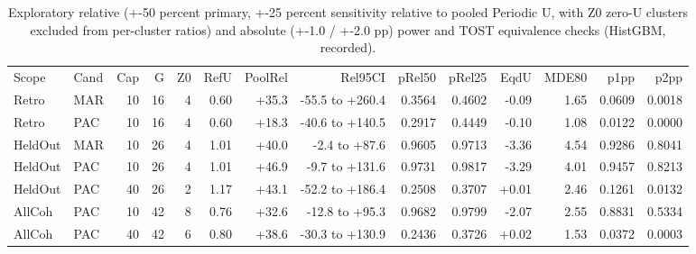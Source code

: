 \begin{table}[!ht]
\centering\footnotesize\setlength{\tabcolsep}{2.2pt}
\caption{Exploratory relative (+-50 percent primary, +-25 percent sensitivity relative to pooled Periodic U, with Z0 zero-U clusters excluded from per-cluster ratios) and absolute (+-1.0 / +-2.0 pp) power and TOST equivalence checks (HistGBM, recorded).}
\begin{tabular}{llrrrrrrrrrrrr}
\hline
Scope & Cand & Cap & G & Z0 & RefU & PoolRel & Rel95CI & pRel50 & pRel25 & EqdU & MDE80 & p1pp & p2pp \\
Retro & MAR & 10 & 16 & 4 & 0.60 & +35.3 & -55.5 to +260.4 & 0.3564 & 0.4602 & -0.09 & 1.65 & 0.0609 & 0.0018 \\
Retro & PAC & 10 & 16 & 4 & 0.60 & +18.3 & -40.6 to +140.5 & 0.2917 & 0.4449 & -0.10 & 1.08 & 0.0122 & 0.0000 \\
HeldOut & MAR & 10 & 26 & 4 & 1.01 & +40.0 & -2.4 to +87.6 & 0.9605 & 0.9713 & -3.36 & 4.54 & 0.9286 & 0.8041 \\
HeldOut & PAC & 10 & 26 & 4 & 1.01 & +46.9 & -9.7 to +131.6 & 0.9731 & 0.9817 & -3.29 & 4.01 & 0.9457 & 0.8213 \\
HeldOut & PAC & 40 & 26 & 2 & 1.17 & +43.1 & -52.2 to +186.4 & 0.2508 & 0.3707 & +0.01 & 2.46 & 0.1261 & 0.0132 \\
AllCoh & PAC & 10 & 42 & 8 & 0.76 & +32.6 & -12.8 to +95.3 & 0.9682 & 0.9799 & -2.07 & 2.55 & 0.8831 & 0.5334 \\
AllCoh & PAC & 40 & 42 & 6 & 0.80 & +38.6 & -30.3 to +130.9 & 0.2436 & 0.3726 & +0.02 & 1.53 & 0.0372 & 0.0003 \\
\hline
\end{tabular}
\end{table}
